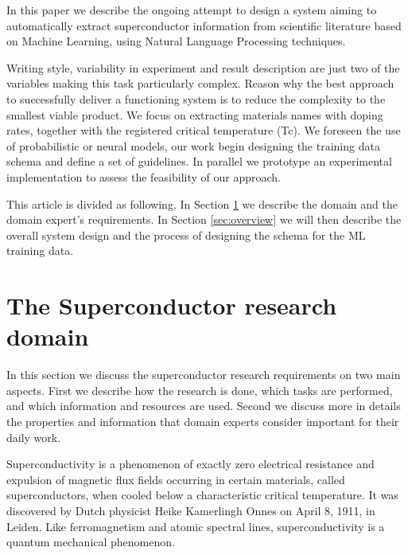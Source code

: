 \documentclass{article}
\begin{document}
In this paper we describe the ongoing attempt to design a system aiming to automatically extract superconductor information from scientific literature based on Machine Learning, using Natural Language Processing techniques. 

Writing style, variability in experiment and result description are just two of the variables making this task particularly complex. Reason why the best approach to successfully deliver a functioning system is to reduce the complexity to the smallest viable product.
We focus on extracting materials names with doping rates, together with the registered critical temperature (Tc). We foreseen the use of probabilistic or neural models, our work begin designing the training data schema and define a set of guidelines. In parallel we prototype an experimental implementation to assess the feasibility of our approach. 


This article is divided as following. In Section \ref{sec:requirements} we describe the domain and the domain expert's requirements. In Section \ref{sec:overview} we will then describe the overall system design and the process of designing the schema for the ML training data. 

\section{The Superconductor research domain}
\label{sec:requirements}

In this section we discuss the superconductor research requirements on two main aspects. First we describe how the research is done, which tasks are performed, and which information and resources are used. Second we discuss more in details the properties and information that domain experts consider important for their daily work. 

Superconductivity is a phenomenon of exactly zero electrical resistance and expulsion of magnetic flux fields occurring in certain materials, called superconductors, when cooled below a characteristic critical temperature. It was discovered by Dutch physicist Heike Kamerlingh Onnes on April 8, 1911, in Leiden. Like ferromagnetism and atomic spectral lines, superconductivity is a quantum mechanical phenomenon.
\end{document}
